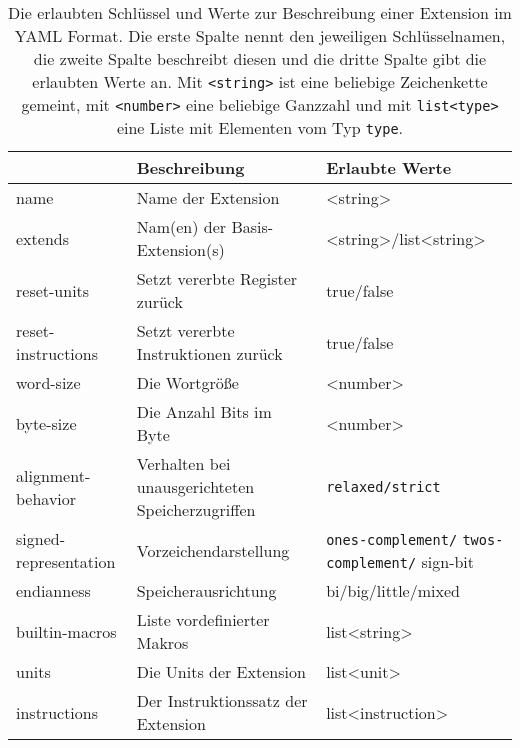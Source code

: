 \begin{table}[p]
  \centering
  \fontsize{10}{12}
  \begin{tabular}{>{\ttfamily}l >{\small}p{7.8cm} >{\ttfamily}p{3.6cm}}
    {\normalfont\bfseries Schlüssel} & \textbf{Beschreibung} & \textbf{Erlaubte Werte}\\
    \toprule
    name & Name der Extension & <string> \\

    extends & Nam(en) der Basis-Extension(s) & <string>/list<string>\\

    reset-units & Setzt vererbte Register zurück & true/false\\

    reset-instructions & Setzt vererbte Instruktionen zurück & true/false\\

    word-size & Die Wortgröße & <number>\\

    byte-size & Die Anzahl Bits im Byte & <number>\\

    alignment-behavior & Verhalten bei unausgerichteten Speicherzugriffen & \texttt{relaxed/strict}\\

    signed-representation & Vorzeichendarstellung & \texttt{ones-complement/} \texttt{twos-complement/} sign-bit \\

    endianness & Speicherausrichtung & bi/big/little/mixed \\

    builtin-macros & Liste vordefinierter Makros & list<string> \\

    units & Die Units der Extension & list<unit> \\

    instructions & Der Instruktionssatz der Extension & list<instruction>
  \end{tabular}
  \caption{Die erlaubten Schlüssel und Werte zur Beschreibung einer Extension im YAML Format. Die erste Spalte nennt den jeweiligen Schlüsselnamen, die zweite Spalte beschreibt diesen und die dritte Spalte gibt die erlaubten Werte an. Mit \texttt{<string>} ist eine beliebige Zeichenkette gemeint, mit \texttt{<number>} eine beliebige Ganzzahl und mit \texttt{list<type>} eine Liste mit Elementen vom Typ \texttt{type}.}
  \label{tbl:isa-top-keys}


\end{table}
